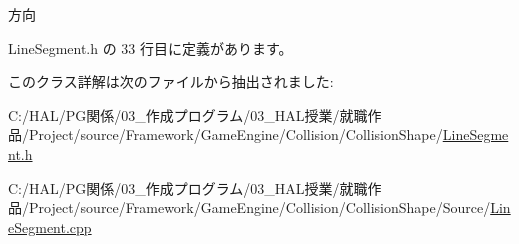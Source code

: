 方向 



 Line\+Segment.\+h の 33 行目に定義があります。



このクラス詳解は次のファイルから抽出されました\+:\begin{DoxyCompactItemize}
\item 
C\+:/\+H\+A\+L/\+P\+G関係/03\+\_\+作成プログラム/03\+\_\+\+H\+A\+L授業/就職作品/\+Project/source/\+Framework/\+Game\+Engine/\+Collision/\+Collision\+Shape/\mbox{\hyperlink{_line_segment_8h}{Line\+Segment.\+h}}\item 
C\+:/\+H\+A\+L/\+P\+G関係/03\+\_\+作成プログラム/03\+\_\+\+H\+A\+L授業/就職作品/\+Project/source/\+Framework/\+Game\+Engine/\+Collision/\+Collision\+Shape/\+Source/\mbox{\hyperlink{_line_segment_8cpp}{Line\+Segment.\+cpp}}\end{DoxyCompactItemize}
